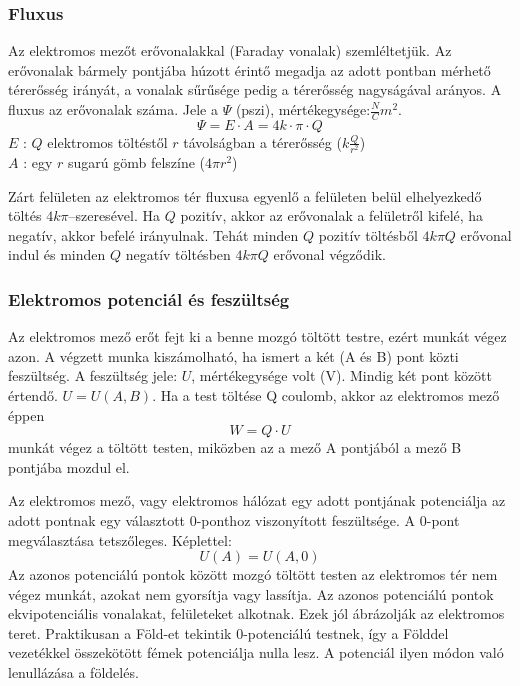 \subsubsection{Fluxus}
Az elektromos mezőt erővonalakkal (Faraday vonalak) szemléltetjük. Az erővonalak bármely pontjába húzott érintő megadja az adott pontban mérhető térerősség irányát, a vonalak sűrűsége pedig a térerősség nagyságával arányos. A fluxus az erővonalak száma. Jele a $\Psi$ (pszi), mértékegysége:$\frac{N}{C}m^2$.
$$ \varPsi = E \cdot A = 4k \cdot \pi \cdot Q $$
$E$ : $Q$ elektromos töltéstől $r$ távolságban a térerősség ($k\frac{Q}{r^2}$)\\
$A$ : egy $r$ sugarú gömb felszíne ($4\pi r^2$)
\begin{theorem}
	Zárt felületen az elektromos tér fluxusa egyenlő a felületen belül elhelyezkedő töltés $4k\pi$–szeresével. Ha $Q$ pozitív, akkor az erővonalak a felületről kifelé, ha negatív, akkor befelé irányulnak. Tehát minden $Q$ pozitív töltésből $4k\pi Q$ erővonal indul és minden $Q$ negatív töltésben $4k\pi Q$ erővonal végződik.
\end{theorem}

\subsubsection{Elektromos potenciál és feszültség}
Az elektromos mező erőt fejt ki a benne mozgó töltött testre, ezért munkát végez azon. A végzett munka kiszámolható, ha ismert a két (A és B) pont közti feszültség. A feszültség jele: $U$, mértékegysége volt (V). Mindig két pont között értendő. $U=U(A,B)$.
Ha a test töltése Q coulomb, akkor az elektromos mező éppen
$$W=Q \cdot U $$
munkát végez a töltött testen, miközben az a mező A pontjából a mező B pontjába mozdul el. 

Az elektromos mező, vagy elektromos hálózat egy adott pontjának potenciálja az adott pontnak egy választott 0-ponthoz  viszonyított feszültsége. A 0-pont megválasztása tetszőleges. Képlettel: 
$$U(A)=U(A,0)$$
Az azonos potenciálú pontok között mozgó töltött testen az elektromos tér nem végez munkát, azokat nem gyorsítja vagy lassítja. Az azonos potenciálú pontok ekvipotenciális vonalakat, felületeket alkotnak. Ezek jól ábrázolják az elektromos teret. Praktikusan a Föld-et tekintik 0-potenciálú testnek, így a Földdel vezetékkel összekötött fémek potenciálja nulla lesz. A potenciál ilyen módon való lenullázása a földelés. 

